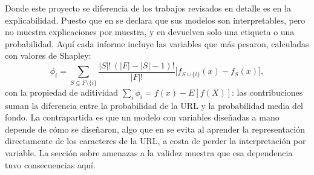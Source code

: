 Donde este proyecto se diferencia de los trabajos revisados en detalle es en la explicabilidad. Puesto que en \cite{alsariera2020ai} se declara que sus modelos son interpretables, pero no muestra explicaciones por muestra, y en \cite{kalabarige2022multilayer,kalabarige2023boosting,duy2024study} devuelven solo una etiqueta o una probabilidad. Aquí cada informe incluye las variables que más pesaron, calculadas con valores de Shapley:
\begin{equation}
\phi_i=\sum_{S\subseteq F\setminus\{i\}}\frac{|S|!\,(|F|-|S|-1)!}{|F|!}\Big[f_{S\cup\{i\}}(x)-f_S(x)\Big],
\label{eq:shapley}
\end{equation}
con la propiedad de aditividad $\sum_i\phi_i=f(x)-E[f(X)]$: las contribuciones suman la diferencia entre la probabilidad de la URL y la probabilidad media del fondo. La contrapartida es que un modelo con variables diseñadas a mano depende de cómo se diseñaron, algo que en \cite{aljofey2020effective} se evita al aprender la representación directamente de los caracteres de la URL, a costa de perder la interpretación por variable. La sección sobre amenazas a la validez muestra que esa dependencia tuvo consecuencias aquí.

